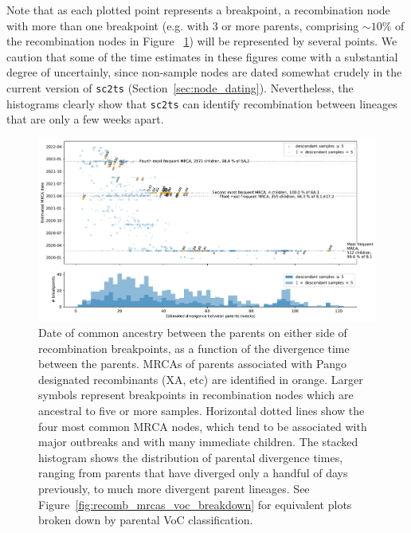 \documentclass{article}
\begin{document}
Note that as each plotted point represents a breakpoint, a recombination
node with more than one breakpoint (e.g. with 3 or more parents,
comprising ${\sim}10 \%$ of the
recombination nodes in Figure ~\ref{fig:recomb_mrcas}) will be represented by several points.
We caution that some of the time estimates in these figures
come with a substantial degree of uncertainly,
since non-sample nodes are dated somewhat crudely in the current version
of \texttt{sc2ts} (Section~\ref{sec:node_dating}). Nevertheless, the histograms
clearly show that \texttt{sc2ts} can identify recombination between lineages
that are only a few weeks apart.

\begin{figure} \centering
\includegraphics[width=\textwidth]{figures/recombination_node_mrcas.pdf}
\caption{\label{fig:recomb_mrcas}
Date of common ancestry between the parents on either side of recombination
breakpoints, as a function of the divergence time between the parents.
MRCAs of parents associated with Pango designated recombinants (XA, etc)
are identified in orange. Larger symbols represent breakpoints in recombination
nodes which are ancestral to five or more samples. 
Horizontal dotted lines show the four most common MRCA nodes,
which tend to be associated with major outbreaks and with many immediate children.
The stacked histogram shows the distribution of parental divergence times, ranging
from parents that have diverged only a handful of days previously, to much more
divergent parent lineages. See Figure~\ref{fig:recomb_mrcas_voc_breakdown}
for equivalent plots broken down by parental VoC classification.
}
\end{figure}
\end{document}
